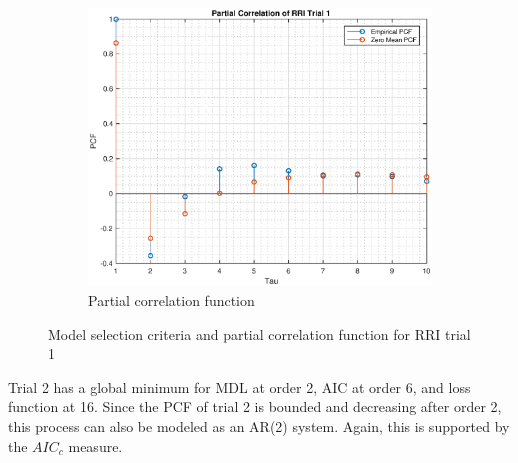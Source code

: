 \documentclass{article}
\begin{document}
\begin{figure}[h!]
\begin{subfigure}{0.32\textwidth}
\centering
\includegraphics[width = \textwidth]{heart_pcf_t1}
\caption{Partial correlation function}
\label{fig:heart_pcf_t1}
\end{subfigure}
\caption{Model selection criteria and partial correlation function for RRI trial 1}
\label{heart_t1}
\end{figure}


Trial 2 has a global minimum for MDL at order 2, AIC at order 6, and loss function at 16. Since the PCF of trial 2 is bounded and decreasing after order 2, this process can also be modeled as an AR(2) system. Again, this is supported by the $AIC_c$ measure.\\
\end{document}
